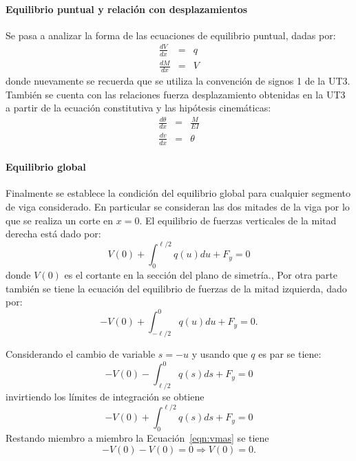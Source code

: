 \paragraph{Equilibrio puntual y relación con desplazamientos}
Se pasa a analizar la forma de las ecuaciones de equilibrio puntual, dadas por:
\begin{eqnarray}
\frac{dV}{d x} &=& q \\
\frac{dM}{d x} &=& V
\end{eqnarray}
donde nuevamente se recuerda que se utiliza la convención de signos 1 de la UT3. También se cuenta con las relaciones fuerza desplazamiento obtenidas en la UT3 a partir de la ecuación constitutiva y las hipótesis cinemáticas:
\begin{eqnarray}
\frac{d\theta}{d x} &=& \frac{M}{E I} \\
\frac{dv}{d x} &=& \theta
\end{eqnarray}



\paragraph{Equilibrio global}
Finalmente se establece la condición del equilibrio global para cualquier segmento de viga considerado. %
%
En particular se consideran las dos mitades de la viga por lo que se realiza un corte en $x=0$. %
%
El equilibrio de fuerzas verticales de la mitad derecha está dado por:
%
\begin{equation}\label{eqn:vmas}
  V(0) + \int_{0}^{\ell/2} q(u) du + F_y = 0
\end{equation}
%
donde $V(0)$ es el cortante en la sección del plano de simetría., %
%
Por otra parte también se tiene la ecuación del equilibrio de fuerzas de la mitad izquierda, dado por:
%
\begin{equation}\label{eqn:vmenos}
  -V(0) + \int_{-\ell/2}^0 q(u) du + F_y = 0.
\end{equation}
%

Considerando el cambio de variable $s=-u$ y usando que $q$ es par se tiene:
\begin{equation}
-V(0) - \int_{\ell/2}^0 q(s) ds + F_y = 0
\end{equation}
invirtiendo los límites de integración se obtiene
%
\begin{equation}
-V(0) + \int_{0}^{\ell/2} q(s) ds + F_y = 0
\end{equation}
Restando miembro a miembro la Ecuación~\eqref{eqn:vmas} se tiene
\begin{equation}\label{eqn:vex}
-V(0) - V(0) = 0\Rightarrow  \boxed{
	V(0) = 0}.
\end{equation}

